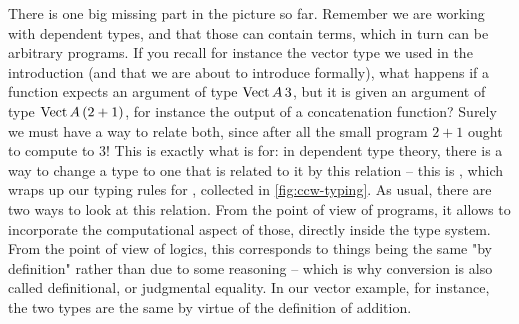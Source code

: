 There is one big missing part in the picture so far. Remember we are working with
dependent types, and that those can contain terms, which in turn can be arbitrary programs.
If you recall for instance the vector type we used in the introduction (and that we are
about to introduce formally), what happens if a function expects an argument of type
$\operatorname{Vect} A\,3$, but it is given an argument of type $\operatorname{Vect} A\,(2+1)$, for instance the output
of a concatenation function? Surely we must have a way to relate both, since after all
the small program $2+1$ ought to compute to $3$! This is exactly what  is
for: in dependent type theory, there is a way to change a type to one that
is related to it by this relation – this is , which wraps up our typing
rules for , collected in \cref{fig:ccw-typing}.
As usual, there are two ways to look at this relation. From the point of view of programs,
it allows to incorporate the computational aspect of those, directly inside the type system.
From the point of view of logics, this corresponds to things being the same "by definition"
rather than due to some reasoning
– which is why conversion is also called definitional, or judgmental equality. In our vector
example, for instance, the two types are the same by virtue of the definition of addition.

\begin{figure*}[h]
  \LastFloat


  \caption{Collected typing rules for }
  \label{fig:ccw-typing}
\end{figure*}

